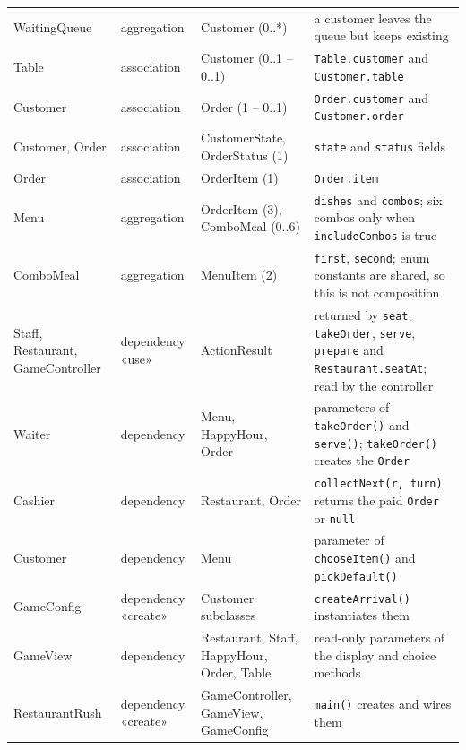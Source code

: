 \begin{longtable}{@{}>{\raggedright\arraybackslash}p{3.1cm}>{\raggedright\arraybackslash}p{2.3cm}>{\raggedright\arraybackslash}p{2.9cm}>{\raggedright\arraybackslash}p{6.3cm}@{}}
WaitingQueue & aggregation & Customer (0..*) & a customer leaves the queue but keeps existing \\
Table & association & Customer (0..1 -- 0..1) & \texttt{Table.customer} and \texttt{Customer.table} \\
Customer & association & Order (1 -- 0..1) & \texttt{Order.customer} and \texttt{Customer.order} \\
Customer, Order & association & CustomerState, OrderStatus (1) & \texttt{state} and \texttt{status} fields \\
Order & association & OrderItem (1) & \texttt{Order.item} \\
Menu & aggregation & OrderItem (3), ComboMeal (0..6) & \texttt{dishes} and \texttt{combos}; six combos only when \texttt{includeCombos} is true \\
ComboMeal & aggregation & MenuItem (2) & \texttt{first}, \texttt{second}; enum constants are shared, so this is not composition \\
Staff, Restaurant, GameController & dependency «use» & ActionResult & returned by \texttt{seat}, \texttt{takeOrder}, \texttt{serve}, \texttt{prepare} and \texttt{Restaurant.seatAt}; read by the controller \\
Waiter & dependency & Menu, HappyHour, Order & parameters of \texttt{takeOrder()} and \texttt{serve()}; \texttt{takeOrder()} creates the \texttt{Order} \\
Cashier & dependency & Restaurant, Order & \texttt{collectNext(r, turn)} returns the paid \texttt{Order} or \texttt{null} \\
Customer & dependency & Menu & parameter of \texttt{chooseItem()} and \texttt{pickDefault()} \\
GameConfig & dependency «create» & Customer subclasses & \texttt{createArrival()} instantiates them \\
GameView & dependency & Restaurant, Staff, HappyHour, Order, Table & read-only parameters of the display and choice methods \\
RestaurantRush & dependency «create» & GameController, GameView, GameConfig & \texttt{main()} creates and wires them \\
\bottomrule
\end{longtable}

